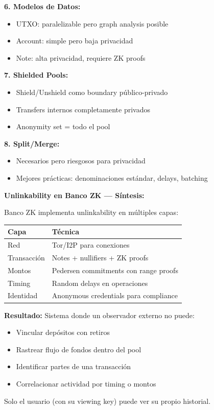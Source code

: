 \documentclass[11pt,a4paper,twoside]{book}
\begin{document}
\begin{keyidea}
\textbf{6. Modelos de Datos:}
\begin{itemize}
    \item UTXO: paralelizable pero graph analysis posible
    \item Account: simple pero baja privacidad
    \item Note: alta privacidad, requiere ZK proofs
\end{itemize}

\textbf{7. Shielded Pools:}
\begin{itemize}
    \item Shield/Unshield como boundary p\'ublico-privado
    \item Transfers internos completamente privados
    \item Anonymity set = todo el pool
\end{itemize}

\textbf{8. Split/Merge:}
\begin{itemize}
    \item Necesarios pero riesgosos para privacidad
    \item Mejores pr\'acticas: denominaciones est\'andar, delays, batching
\end{itemize}
\end{keyidea}

\begin{bancozk}
\textbf{Unlinkability en Banco ZK --- S\'intesis:}

Banco ZK implementa unlinkability en m\'ultiples capas:

\begin{center}
\begin{tabular}{ll}
\toprule
\textbf{Capa} & \textbf{T\'ecnica} \\
\midrule
Red & Tor/I2P para conexiones \\
Transacci\'on & Notes + nullifiers + ZK proofs \\
Montos & Pedersen commitments con range proofs \\
Timing & Random delays en operaciones \\
Identidad & Anonymous credentials para compliance \\
\bottomrule
\end{tabular}
\end{center}

\textbf{Resultado:} Sistema donde un observador externo no puede:
\begin{itemize}
    \item Vincular dep\'ositos con retiros
    \item Rastrear flujo de fondos dentro del pool
    \item Identificar partes de una transacci\'on
    \item Correlacionar actividad por timing o montos
\end{itemize}

Solo el usuario (con su viewing key) puede ver su propio historial.
\end{bancozk}
\end{document}
